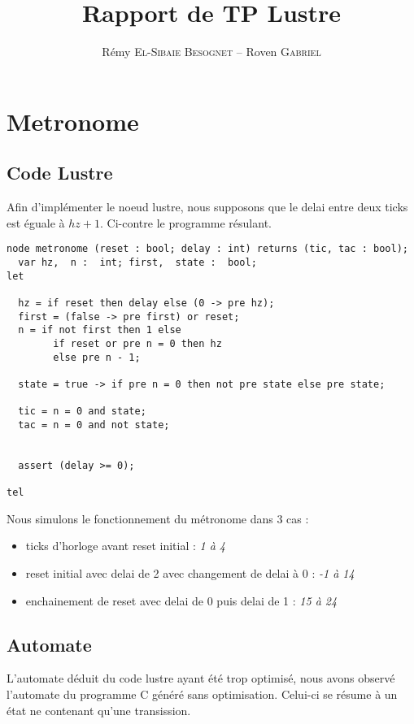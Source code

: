 \documentclass[a4paper]{article}
\title{Rapport de TP Lustre}
\author{Rémy \textsc{El-Sibaie Besognet} -- Roven \textsc{Gabriel}}
\begin{document}
\maketitle

\section{Metronome}

\subsection{Code Lustre}
Afin d'implémenter le noeud lustre, nous supposons que le delai entre deux ticks
est éguale à $hz + 1 $. Ci-contre le programme résulant. %
\begin{verbatim}
node metronome (reset : bool; delay : int) returns (tic, tac : bool);
  var hz,  n :  int; first,  state :  bool;  
let 
  
  hz = if reset then delay else (0 -> pre hz);
  first = (false -> pre first) or reset;
  n = if not first then 1 else 
        if reset or pre n = 0 then hz
        else pre n - 1;

  state = true -> if pre n = 0 then not pre state else pre state;

  tic = n = 0 and state;
  tac = n = 0 and not state;
  
  
  assert (delay >= 0);

tel 
\end{verbatim}

Nous simulons le fonctionnement du métronome dans 3 cas : 
\begin{itemize}
\item ticks d'horloge avant reset initial : \emph{1 à 4}
\item reset initial avec delai de 2 avec changement de delai à 0 : \emph{-1 à 14}
\item enchainement de reset avec delai de 0 puis delai de 1 : \emph{15 à 24}
\end{itemize}

\vspace{10mm}



\subsection{Automate}
L'automate déduit du code lustre ayant été trop optimisé, nous avons observé 
l'automate du programme C généré sans optimisation. Celui-ci se résume à un état ne 
contenant qu'une transission.\\
\end{document}

